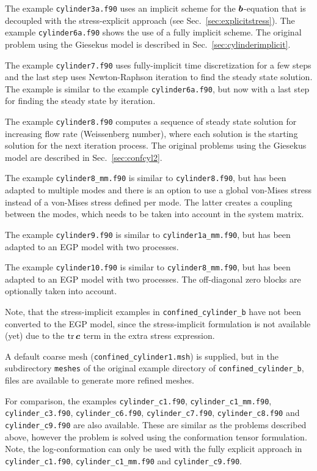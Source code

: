 The example \texttt{cylinder3a.f90} uses an implicit scheme for the $\boldsymbol{b}$-equation that is decoupled with the
stress-explicit approach (see Sec.~\ref{sec:explicitstress}). The example \texttt{cylinder6a.f90}
shows the use of a fully implicit scheme. The original problem using the Giesekus model is described in Sec.~\ref{sec:cylinderimplicit}.

The example \texttt{cylinder7.f90} uses
fully-implicit time discretization for a few steps and the last step uses Newton-Raphson iteration to
find the steady state solution. The example is similar to the example \texttt{cylinder6a.f90}, but now with a last step for finding the steady state by iteration.

The example \texttt{cylinder8.f90} computes a sequence of steady state solution for increasing flow rate (Weissenberg number), where each solution is the starting solution for the next iteration process. The original problems using the Giesekus model are described in Sec.~\ref{sec:confcyl2}.

The example \texttt{cylinder8\_mm.f90} is similar to \texttt{cylinder8.f90}, but has been adapted to multiple modes and there is an option to use a global von-Mises stress instead of a von-Mises stress defined per mode. The latter creates a coupling between the modes, which needs to be taken into account in the system matrix.

The example \texttt{cylinder9.f90} is similar to \texttt{cylinder1a\_mm.f90}, but has been adapted to an EGP model with two processes.

The example \texttt{cylinder10.f90} is similar to \texttt{cylinder8\_mm.f90}, but has been adapted to an EGP model with two processes. The off-diagonal zero blocks are optionally taken into account.

Note, that the stress-implicit examples in \texttt{confined\_cylinder\_b} have not been converted to the EGP model, since the stress-implicit formulation is not available (yet) due to the $\operatorname{tr}\boldsymbol{c}$ term in the extra stress expression.

A default coarse mesh (\texttt{confined\_cylinder1.msh}) is supplied, but in the
subdirectory \texttt{meshes} of the original example directory of \texttt{confined\_cylinder\_b}, files are available to generate more refined meshes.

For comparison, the examples \texttt{cylinder\_c1.f90}, \texttt{cylinder\_c1\_mm.f90}, \texttt{cylinder\_c3.f90}, \texttt{cylinder\_c6.f90}, \texttt{cylinder\_c7.f90}, \texttt{cylinder\_c8.f90} and \texttt{cylinder\_c9.f90} are also available.
These are similar as the problems described above, however
the problem is solved using the conformation tensor formulation. Note, the log-conformation can only be used with the fully explicit approach in \texttt{cylinder\_c1.f90}, \texttt{cylinder\_c1\_mm.f90} and \texttt{cylinder\_c9.f90}.

